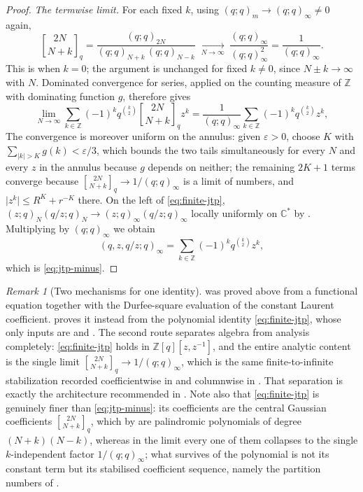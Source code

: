 \documentclass[11pt,oneside,openany]{book}
\theoremstyle{definition}
\theoremstyle{remark}
\newtheorem{remark}[remark]{Remark}
\newcommand{\qbinom}[2]{\genfrac{[}{]}{0pt}{}{#1}{#2}_{q}}
\newcommand{\eps}{\varepsilon}
\newcommand{\C}{\mathbb C}
\newcommand{\Z}{\mathbb Z}
\newcommand{\abs}[1]{\lvert #1\rvert}
\begin{document}
\begin{proof}
\emph{The termwise limit.}  For each fixed $k$, using $(q;q)_m\to(q;q)_\infty\ne0$ again,
\[
 \qbinom{2N}{N+k}
 =\frac{(q;q)_{2N}}{(q;q)_{N+k}\,(q;q)_{N-k}}
 \;\xrightarrow[N\to\infty]{}\;
 \frac{(q;q)_\infty}{(q;q)_\infty^{2}}
 =\frac1{(q;q)_\infty}.
\]
This is  when $k=0$; the argument is unchanged for
fixed $k\ne0$, since $N\pm k\to\infty$ with $N$.
Dominated convergence for series, applied on the counting measure of $\Z$ with dominating function $g$, therefore gives
\[
 \lim_{N\to\infty}\sum_{k\in\Z}(-1)^kq^{\binom k2}
 \qbinom{2N}{N+k}z^{k}
 =\frac1{(q;q)_\infty}\sum_{k\in\Z}(-1)^kq^{\binom k2}z^{k},
\]
The convergence is moreover uniform on the annulus: given $\eps>0$, choose $K$ with $\sum_{\abs k>K}g(k)<\eps/3$, which bounds the two tails simultaneously for every $N$ and every $z$ in the annulus because $g$ depends on neither; the remaining $2K+1$ terms converge because $\qbinom{2N}{N+k}\to1/(q;q)_\infty$ is a limit of numbers, and $\abs{z^k}\le R^{K}+r^{-K}$ there.  On the left of \eqref{eq:finite-jtp}, $(z;q)_N(q/z;q)_N\to(z;q)_\infty(q/z;q)_\infty$ locally uniformly on $\C^{*}$ by .  Multiplying by $(q;q)_\infty$ we obtain
\[
 (q,z,q/z;q)_\infty
 =\sum_{k\in\Z}(-1)^kq^{\binom k2}z^{k},
\]
which is \eqref{eq:jtp-minus}.
\end{proof}

\begin{remark}[Two mechanisms for one identity]\label{rem:jtp-two-proofs}
 was proved above from a functional equation together with the Durfee-square evaluation of the constant Laurent coefficient.   proves it instead from the polynomial identity \eqref{eq:finite-jtp}, whose only inputs are  and .  The second route separates algebra from analysis completely: \eqref{eq:finite-jtp} holds in $\Z[q][z,z^{-1}]$, and the entire analytic content is the single limit $\qbinom{2N}{N+k}\to1/(q;q)_\infty$, which is the same finite-to-infinite stabilization recorded coefficientwise in  and columnwise in .  That separation is exactly the architecture recommended in .  Note also that \eqref{eq:finite-jtp} is genuinely finer than \eqref{eq:jtp-minus}: its coefficients are the central Gaussian coefficients $\qbinom{2N}{N+k}$, which by  are palindromic polynomials of degree $(N+k)(N-k)$, whereas in the limit every one of them collapses to the single $k$-independent factor $1/(q;q)_\infty$; what survives of the polynomial is not its constant term but its stabilised coefficient sequence, namely the partition numbers of .
\end{remark}
\end{document}
